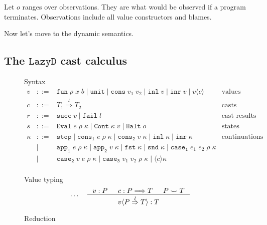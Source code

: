 \documentclass[acmsmall,review,anonymous]{acmart}\settopmatter{printfolios=true,printccs=false,printacmref=false}
\newcommand{\stxrule}[3]{#1 & ::= & #3 & \text{#2}\\}
\newcommand{\stxrulecont}[1]{& | & #1 & \\}
\newcommand{\lazyD}{$\mathtt{Lazy D}$}
\newcommand{\sOOinspect}[3]{\mathtt{Eval} \; #1 \; #2 \; #3}
\newcommand{\sOOreturn}[2]{\mathtt{Cont} \; #2 \; #1}
\newcommand{\sOOhalt}[1]{\mathtt{Halt} \; #1}
\newcommand{\cOOcast}[3]{#1 \overset{#2}{\Rightarrow} #3}
\newcommand{\vOOcast}[2]{#1\langle#2\rangle}
\newcommand{\vOOfun}[3]{\mathtt{fun} \; #1 \; #2 \; #3}
\newcommand{\vOOtt}[0]{\mathtt{unit}}
\newcommand{\vOOcons}[2]{\mathtt{cons}\;#1\;#2}
\newcommand{\vOOinl}[1]{\mathtt{inl}\;#1}
\newcommand{\vOOinr}[1]{\mathtt{inr}\;#1}
\newcommand{\rOOsucc}[1]{\mathtt{succ}\;#1}
\newcommand{\rOOfail}[1]{\mathtt{fail}\;#1}
\newcommand{\judgeDCreduce}[2]{#1 \longrightarrow_{\mathcal{D}} #2}
\begin{document}
Let $ o $ ranges over observations. They are what would be observed if a 
program terminates. Observations include all value constructors and blames.


Now let's move to the dynamic semantics. 

\subsection{The \lazyD{} cast calculus}

\begin{figure}
	Syntax
	\[
	\begin{array}{rclr}
	
	\stxrule{v}{values}{
		\vOOfun{\rho}{x}{b} \mid
		\vOOtt{} \mid
		\vOOcons{v_1}{v_2} \mid
		\vOOinl{v} \mid
		\vOOinr{v} \mid		
		\vOOcast{v}{c}
	}
	\stxrule{c}{casts}{
		\cOOcast{T_1}{l}{T_2}
	}
	\stxrule{r}{cast results}{
		\rOOsucc{v} \mid
		\rOOfail{l}
	}
	\stxrule{s}{states}{
		\sOOinspect{e}{\rho}{\kappa} \mid{}
		\sOOreturn{v}{\kappa} \mid{}
		\sOOhalt{o}
	}
		
	\stxrule{\kappa}{continuations}{
		\mathtt{stop} \mid{}
		\mathtt{cons_1} \; e \; \rho \; \kappa \mid{}
		\mathtt{cons_2} \; v \; \kappa \mid{}
		\mathtt{inl} \; \kappa \mid{}
		\mathtt{inr} \; \kappa
	}
	\stxrulecont{
		\mathtt{app_1} \; e \; \rho \; \kappa \mid{}
		\mathtt{app_2} \; v \; \kappa \mid{}
		\mathtt{fst} \; \kappa \mid{}
		\mathtt{snd} \; \kappa \mid
		\mathtt{case_1} \; e_1 \; e_2 \; \rho \; \kappa
	}
	\stxrulecont{	
		\mathtt{case_2} \; v   \; e   \; \rho \; \kappa \mid{}
		\mathtt{case_3} \; v_1 \; v_2 \; \rho \; \kappa \mid
		\langle c \rangle \kappa
	}
	\end{array}
	\]
	
	Value typing 
	\begin{gather*}
	\dots \quad
	\inference{
		v : P &
		c : P \Longrightarrow T &
		P \smile T
	}{
		\vOOcast{v}{\cOOcast{P}{l}{T}} : T
	}
	\end{gather*}
	
	
	Reduction \fbox{$ \judgeDCreduce{s}{s} $}
	\[
	\begin{array}{rclr}
	

\end{array}\]
\end{figure}
\end{document}
